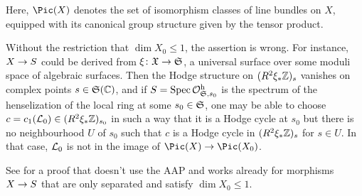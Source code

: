 \begin{rem}
	\begin{alphanumerate}
		\item Here, $\Pic(X)$ denotes the set of isomorphism classes of line bundles on $X$, equipped with its canonical group structure given by the tensor product.
		\item Without the restriction that $\dim X_0\leq 1$, the assertion is wrong. For instance, $X\morphism S$ could be derived from $\xi\colon \XX\morphism \SS$, a universal surface over some moduli space of algebraic surfaces. Then the Hodge structure on $(R^2\xi_*\mathbb{Z})_s$ vanishes on complex points $s\in\mathfrak{S}(\mathbb{C})$, and if $S=\operatorname{Spec} \mathcal{O}_{\mathfrak{S},s_0}^{\mathrm{h}}$ is the spectrum of the henselization of the local ring at some $s_0\in\mathfrak{S}$, one may be able to choose $c=c_1(\mathcal{L}_0)\in (R^2\xi_*\mathbb{Z})_{s_0}$ in such a way that it is a Hodge cycle at $s_0$ but there is no neighbourhood $U$ of $s_0$ such that $c$ is a Hodge cycle in $(R^2\xi_*\mathbb{Z})_s$ for $s\in U$. In that case, $\mathcal{L}_0$ is not in the image of $\Pic(X)\morphism\Pic(X_0)$.
		\item See \cite[Arcata~IV Prop.]{sga4.5} for a proof that doesn't use the AAP and works already for morphisms $X\morphism S$ that are only separated and satisfy $\dim X_0\leq 1$.
	\end{alphanumerate}
\end{rem}
